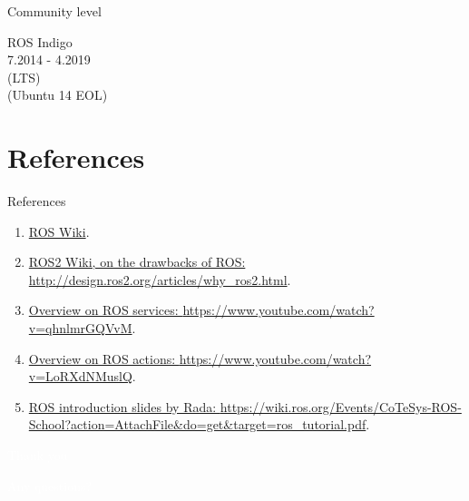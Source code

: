 \documentclass{beamer}
\begin{document}
\begin{frame}{Community level}
\begin{textblock}{3}
         \centering
         ROS Indigo\\
         \footnotesize 7.2014 - 4.2019\\
         (LTS)\\
         (Ubuntu 14 EOL)\\
     \end{textblock}                       
\end{frame}






\section{References}
\begin{frame}{References}

    \begin{enumerate}
        \item \href{http://wiki.ros.org/ROS/Introduction}{ROS Wiki}.
        \item \href{http://design.ros2.org/articles/why_ros2.html}{ROS2 Wiki, on the drawbacks of ROS:  \tiny{http://design.ros2.org/articles/why\_ros2.html}}.
        \item \href{https://www.youtube.com/watch?v=qhnlmrGQVvM}{Overview on ROS services: \tiny{https://www.youtube.com/watch?v=qhnlmrGQVvM}}.
        
         \item \href{https://www.youtube.com/watch?v=LoRXdNMuslQ}{Overview on ROS actions: \tiny{https://www.youtube.com/watch?v=LoRXdNMuslQ}}.   
             
        \item \href{https://wiki.ros.org/Events/CoTeSys-ROS-School?action=AttachFile&do=get&target=ros_tutorial.pdf}{ROS introduction slides by Rada: \tiny{https://wiki.ros.org/Events/CoTeSys-ROS-School?action=AttachFile\&do=get\&target=ros\_tutorial.pdf}}.
    \end{enumerate}
\end{frame}


\begin{frame}[plain]{}  
    \centering
    {\huge \textcolor{white}{Thank you}}
    
    \vspace{0.5cm}
    
    {\huge \textcolor{white}{Any questions?}}
\end{frame}
\end{document}
